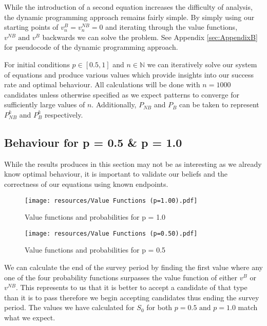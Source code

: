 \documentclass[a4paper,11pt]{article}
\begin{document}
While the introduction of a second equation increases the difficulty of analysis, the dynamic programming approach remains fairly simple. By simply using our starting points of $v_{n}^{B} = v_{n}^{NB} = 0$ and iterating through the value functions, $v^{NB} \text{ and } v^B$ backwards we can solve the problem. See Appendix \ref{sec:AppendixB} for pseudocode of the dynamic programming approach.

For initial conditions $p \in [0.5,1]$ and $n \in \mathbb{N}$ we can iteratively solve our system of equations and produce various values which provide insights into our success rate and optimal behaviour. All calculations will be done with $n=1000$ candidates unless otherwise specified as we expect patterns to converge for sufficiently large values of $n$. Additionally, $P_{NB}$ and $P_B$ can be taken to represent $P_{NB}^k$ and $P_B^{k}$ respectively.

\subsection{Behaviour for p = 0.5 \& p = 1.0}

While the results produces in this section may not be as interesting as we already know optimal behaviour, it is important to validate our beliefs and the correctness of our equations using known endpoints.

\begin{figure}[H] 
    \centering 
    \texttt{[image: resources/Value Functions (p=1.00).pdf]}
    \caption{Value functions and probabilities for p = 1.0}
    \label{fig:value p=1.0} 
\end{figure}

\begin{figure}[H] 
    \centering
\texttt{[image: resources/Value Functions (p=0.50).pdf]}
    \caption{Value functions and probabilities for p = 0.5}
    \label{fig:value p = 0.5} 
\end{figure}



We can calculate the end of the survey period by finding the first value where any one of the four probability functions surpasses the value function of either $v^B$ or $v^{NB}$. This represents to us that it is better to accept a candidate of that type than it is to pass therefore we begin accepting candidates thus ending the survey period. The values we have calculated for $S_0$ for both $p=0.5 \text{ and } p = 1.0$ match what we expect.
\end{document}
